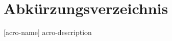 \section*{Abkürzungsverzeichnis}


\begin{acronym}[HRTEM]

 [acro-name] {acro-description}


\end{acronym}
